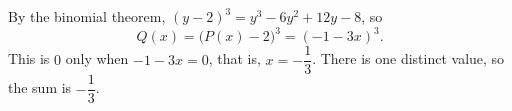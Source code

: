 By the binomial theorem, $(y-2)^3=y^3-6y^2+12y-8$, so
\[Q(x)=\bigl(P(x)-2\bigr)^3=(-1-3x)^3.\]
This is $0$ only when $-1-3x=0$, that is, $x=-\dfrac13$. There is one distinct value, so the sum is $\boxed{-\dfrac13}$.
